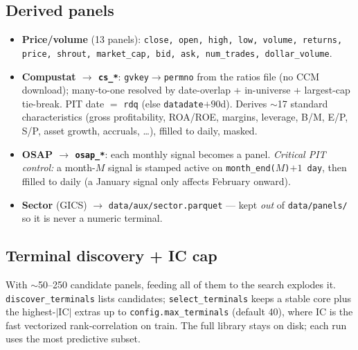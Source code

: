 \documentclass[11pt]{article}
\newcommand{\code}[1]{\texttt{#1}}
\newcommand{\file}[1]{\texttt{#1}}
\begin{document}
\subsection{Derived panels}
\begin{itemize}[leftmargin=*]
  \item \textbf{Price/volume} (13 panels): \code{close, open, high, low, volume,
  returns, price, shrout, market\_cap, bid, ask, num\_trades, dollar\_volume}.
  \item \textbf{Compustat $\to$ \code{cs\_*}}: \code{gvkey}$\to$\code{permno} from the
  ratios file (no CCM download); many-to-one resolved by date-overlap + in-universe +
  largest-cap tie-break. PIT date $=$ \code{rdq} (else \code{datadate}$+90$d). Derives
  $\sim$17 standard characteristics (gross profitability, ROA/ROE, margins, leverage,
  B/M, E/P, S/P, asset growth, accruals, \ldots), ffilled to daily, masked.
  \item \textbf{OSAP $\to$ \code{osap\_*}}: each monthly signal becomes a panel.
  \emph{Critical PIT control:} a month-$M$ signal is stamped active on
  \code{month\_end($M$)$+1$ day}, then ffilled to daily (a January signal only affects
  February onward).
  \item \textbf{Sector} (GICS) $\to$ \file{data/aux/sector.parquet} --- kept
  \emph{out} of \file{data/panels/} so it is never a numeric terminal.
\end{itemize}

\subsection{Terminal discovery + IC cap}
With $\sim$50--250 candidate panels, feeding all of them to the search explodes it.
\code{discover\_terminals} lists candidates; \code{select\_terminals} keeps a stable
core plus the highest-$|$IC$|$ extras up to \code{config.max\_terminals} (default 40),
where IC is the fast vectorized rank-correlation on train. The full library stays on
disk; each run uses the most predictive subset.
\end{document}
